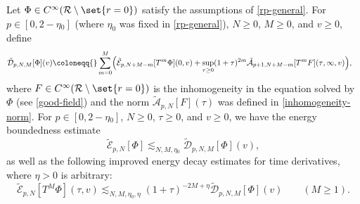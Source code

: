 \documentclass[10pt, reqno]{amsart}
\begin{document}
\begin{proposition}
Let \(\Phi{}\in C^\infty(\mathcal{R}\setminus \set{r=0})\) satisfy the assumptions of
\cref{rp-general}. For \(p\in [0,2-\eta{}_0]\) (where \(\eta_0\) was fixed in
\cref{rp-general}), \(N\ge 0\), \(M\ge 0\), and \(v\ge 0\), define
\begin{equation}
\begin{split}
\tilde{\mathcal{D}}_{p,N,M}[\Phi{}](v)&\coloneqq{}\sum_{m=0}^M \Bigl(\tilde{\mathcal{E}}_{p,N+M-m}[T^{m}\Phi{}](0,v) + \sup_{\tau{}\ge 0}(1+\tau{})^{2m}\tilde{\mathcal{A}}_{p+1,N+M-m}[T^{m}F](\tau{},\infty,v)\Bigr),
\end{split}
\end{equation}
where \(F\in C^\infty(\mathcal{R}\setminus \set{r=0})\) is the inhomogeneity in the equation
solved by \(\Phi{}\) (see \cref{good-field}) and the norm
\(\tilde{\mathcal{A}}_{p,N}[F](\tau{})\) was defined in \cref{inhomogeneity-norm}. For \(p\in
[0,2-\eta{}_0]\), \(N\ge 0\), \(\tau{}\ge 0\), and \(v\ge 0\), we have the energy boundedness
estimate
\begin{equation}\label{improved-decay-u-0}
\tilde{\mathcal{E}}_{p,N}[\Phi{}]\lesssim_{N,M,\eta{}_0} \tilde{\mathcal{D}}_{p,N,M}[\Phi{}](v),
\end{equation}
as well as the following improved energy decay estimates for time derivatives,
where \(\eta{} > 0\) is arbitrary:
\begin{equation}\label{improved-decay-u}
\tilde{\mathcal{E}}_{p,N}[T^M\Phi{}](\tau{},v)\lesssim_{N,M,\eta{}_0,\eta{}} (1+\tau{})^{-2M+ \eta{}} \tilde{\mathcal{D}}_{p,N,M}[\Phi{}](v)\qquad (M\ge 1).
\end{equation}
\label{energy-decay}
\end{proposition}
\end{document}

